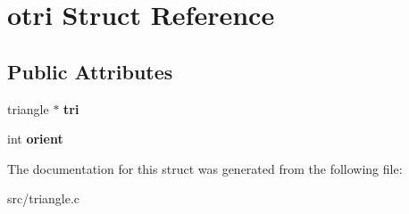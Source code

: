 \hypertarget{structotri}{
\section{otri Struct Reference}
\label{structotri}
}
\subsection*{Public Attributes}
\begin{DoxyCompactItemize}
\item 
\hypertarget{structotri_a238238ab7eb61074eceb8382b6bdc835}{
triangle $\ast$ {\bfseries tri}}
\label{structotri_a238238ab7eb61074eceb8382b6bdc835}

\item 
\hypertarget{structotri_a3f79d64391ce76f64acc0aec04bf8805}{
int {\bfseries orient}}
\label{structotri_a3f79d64391ce76f64acc0aec04bf8805}

\end{DoxyCompactItemize}


The documentation for this struct was generated from the following file:\begin{DoxyCompactItemize}
\item 
src/triangle.c\end{DoxyCompactItemize}

